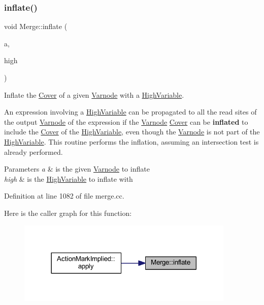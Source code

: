 \subsubsection{\texorpdfstring{inflate()}{inflate()}}
{\footnotesize\ttfamily void Merge\+::inflate (\begin{DoxyParamCaption}\item[{\mbox{\hyperlink{class_varnode}{Varnode}} $\ast$}]{a,  }\item[{\mbox{\hyperlink{class_high_variable}{High\+Variable}} $\ast$}]{high }\end{DoxyParamCaption})}



Inflate the \mbox{\hyperlink{class_cover}{Cover}} of a given \mbox{\hyperlink{class_varnode}{Varnode}} with a \mbox{\hyperlink{class_high_variable}{High\+Variable}}. 

An expression involving a \mbox{\hyperlink{class_high_variable}{High\+Variable}} can be propagated to all the read sites of the output \mbox{\hyperlink{class_varnode}{Varnode}} of the expression if the \mbox{\hyperlink{class_varnode}{Varnode}} \mbox{\hyperlink{class_cover}{Cover}} can be {\bfseries{inflated}} to include the \mbox{\hyperlink{class_cover}{Cover}} of the \mbox{\hyperlink{class_high_variable}{High\+Variable}}, even though the \mbox{\hyperlink{class_varnode}{Varnode}} is not part of the \mbox{\hyperlink{class_high_variable}{High\+Variable}}. This routine performs the inflation, assuming an intersection test is already performed. 
\begin{DoxyParams}{Parameters}
{\em a} & is the given \mbox{\hyperlink{class_varnode}{Varnode}} to inflate \\
\hline
{\em high} & is the \mbox{\hyperlink{class_high_variable}{High\+Variable}} to inflate with \\
\hline
\end{DoxyParams}


Definition at line 1082 of file merge.\+cc.

Here is the caller graph for this function\+:
\nopagebreak
\begin{figure}[H]
\begin{center}
\leavevmode
\includegraphics[width=294pt]{class_merge_a157b6a6d44e6aec22f1bb77201f3e402_icgraph}
\end{center}
\end{figure}
\mbox{\label{class_merge_a682cf4cedcb80161fa47a1f0c7382a77}} 

